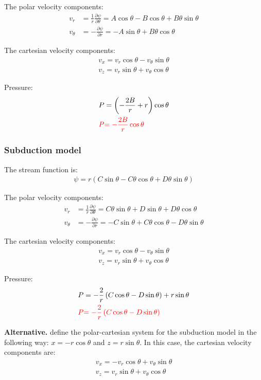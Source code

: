 \documentclass[a4paper,11pt]{article}
\newcommand{\red}[1]{\textcolor{red}{#1}}
\begin{document}
The polar velocity components:
\begin{align}
 v_r&= \frac{1}{r}\frac{\partial\psi}{\partial\theta} = A\cos\theta-B\cos\theta+B\theta\sin\theta\\
v_\theta&=-\frac{\partial\psi}{\partial r} = -A\sin\theta+B\theta\cos\theta
 \end{align}
 
The cartesian velocity components:
\begin{align}
v_x = v_r\cos\theta - v_\theta\sin\theta\\
v_z = v_r\sin\theta + v_\theta\cos\theta
\end{align}

Pressure:
\begin{align}
P &= \left(-\frac{2B}{r}+r\right)\cos\theta\\
\red{P } &\red{= -\frac{2B}{r}\cos\theta}
\end{align}

\subsubsection{Subduction model}
The stream function is:
\begin{align}
\psi = r(C\sin\theta-C\theta\cos\theta+D\theta\sin\theta)
\end{align}

The polar velocity components:
\begin{align}
 v_r&= \frac{1}{r}\frac{\partial\psi}{\partial\theta} = C\theta\sin\theta+D\sin\theta+D\theta\cos\theta\\
v_\theta&=-\frac{\partial\psi}{\partial r} = -C\sin\theta+C\theta\cos\theta-D\theta\sin\theta
 \end{align}
 
The cartesian velocity components:
\begin{align}
v_x = v_r\cos\theta - v_\theta\sin\theta\\
v_z = v_r\sin\theta + v_\theta\cos\theta
\end{align}

Pressure:
\begin{align}
P &= -\frac{2}{r}\left(C\cos\theta-D\sin\theta\right)+r\sin\theta \\
\red{P } &\red{= -\frac{2}{r}\left(C\cos\theta-D\sin\theta\right)}
\end{align}

\textbf{Alternative.} \citet{Spiegelman1987} define the polar-cartesian system for the subduction model in the following way: $x=-r\cos\theta$ and $z=r\sin\theta$. In this case, the cartesian velocity components are:
\begin{align}
v_x = -v_r\cos\theta + v_\theta\sin\theta\\
v_z = v_r\sin\theta + v_\theta\cos\theta
\end{align}
\end{document}
